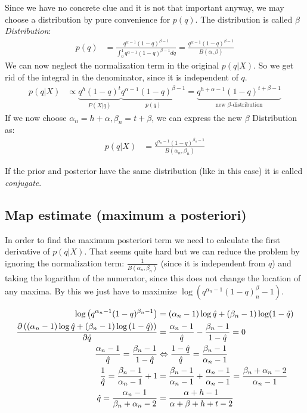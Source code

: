 Since we have no concrete clue and it is not that important anyway, we may choose a distribution by pure convenience for $p(q)$. The distribution is called \textit{$\beta$ Distribution}:
\begin{align*}
p(q) &= \frac{q^{\alpha-1}(1-q)^{\beta-1}}{\int_0^1 q^{\alpha-1}(1-q)^{\beta-1}dq} = \frac{q^{\alpha-1}(1-q)^{\beta-1}}{B(\alpha,\beta)}
\end{align*}
We can now neglect the normalization term in the original $p(q|X)$. So we get rid of the integral in the denominator, since it is independent of $q$.
\begin{align*}
p(q|X) &\propto \underbrace{q^h(1-q)^t}_{P(X|q)} \underbrace{q^{\alpha-1}(1-q)^{\beta-1}}_{p(q)} = \underbrace{q^{h+\alpha-1}(1-q)^{t+\beta-1}}_\text{new $\beta$-distribution}
\end{align*}
If we now choose $\alpha_n = h+\alpha, \beta_n = t+\beta$, we can express the new $\beta$ Distribution as:
\begin{align*}
p(q|X) &= \frac{q^{\alpha_n-1}(1-q)^{\beta_n-1}}{B(\alpha_n, \beta_n)} 
\end{align*}

If the prior and posterior have the same distribution (like in this case) it is called \textit{conjugate}.

\subsection{Map estimate (maximum a posteriori)}
In order to find the maximum posteriori term we need to calculate the first derivative of $p(q|X)$. That seems quite hard but we can reduce the problem by ignoring the normalization term: $\frac{1}{B(\alpha_n, \beta_n)}$ (since it is independent from $q$) and taking the logarithm of the numerator, since this does not change the location of any maxima. By this we just have to maximize $\log(q^{\alpha_n-1}(1-q)^\beta_n-1)$.

\begin{align*}
\log{\left(q^{\alpha_n-1}(1-q)^{\beta_n-1}\right)} &= (\alpha_n-1)\log \est{q} + (\beta_n-1)\log (1-\est{q}) \\
\frac{\partial \left(\left(\alpha_n-1\right)\log \est{q} + \left(\beta_n-1\right)\log \left(1-\est{q}\right)\right)}{\partial \est{q}} &= \frac{\alpha_n-1}{\est{q}} - \frac{\beta_n-1}{1-\est{q}} = 0 \\
\frac{\alpha_n-1}{\est{q}} = \frac{\beta_n-1}{1-\est{q}} &\Leftrightarrow \frac{1-\est{q}}{\est{q}} = \frac{\beta_n-1}{\alpha_n-1} \\
\frac{1}{\est{q}} = \frac{\beta_n-1}{\alpha_n-1}+1 &= \frac{\beta_n-1}{\alpha_n-1} + \frac{\alpha_n-1}{\alpha_n-1} = \frac{\beta_n+\alpha_n-2}{\alpha_n-1} \\
\est{q} = \frac{\alpha_n-1}{\beta_n+\alpha_n-2} &= \frac{\alpha+h-1}{\alpha+\beta+h+t-2}
\end{align*}

